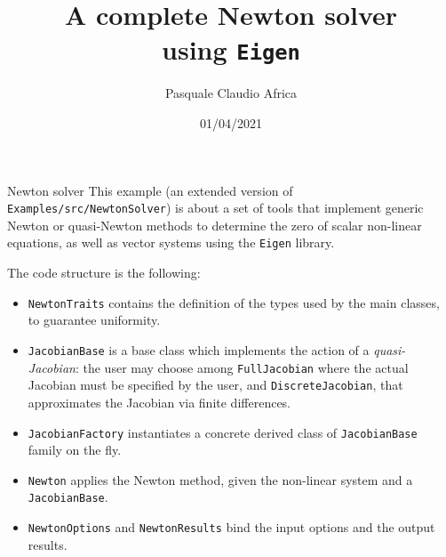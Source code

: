 \documentclass[10pt]{beamer}
\begin{document}
    \title{A complete Newton solver\protect\\ using \texttt{Eigen}}
    \author{Pasquale Claudio Africa}
    \date{01/04/2021}

\begin{frame}
    \maketitle
\end{frame}

\begin{frame}{Newton solver}
This example (an extended version of \texttt{Examples/src/NewtonSolver}) is about a set of tools that implement generic Newton or quasi-Newton methods to determine the zero of scalar non-linear equations, as well as vector systems using the \texttt{Eigen} library.

The code structure is the following:
\begin{itemize}
\item \texttt{NewtonTraits} contains the definition of the types used by the main classes, to guarantee uniformity.
\item \texttt{JacobianBase} is a base class which implements the action of a \textit{quasi-Jacobian}: the user may choose among \texttt{FullJacobian} where the actual Jacobian must be specified by the user, and \texttt{DiscreteJacobian}, that approximates the Jacobian via finite differences.
\item \texttt{JacobianFactory} instantiates a concrete derived class of \texttt{JacobianBase} family on the fly.
\item \texttt{Newton} applies the Newton method, given the non-linear system and a \texttt{JacobianBase}.
\item \texttt{NewtonOptions} and \texttt{NewtonResults} bind the input options and the output results.
\end{itemize}
\end{frame}
\end{document}
